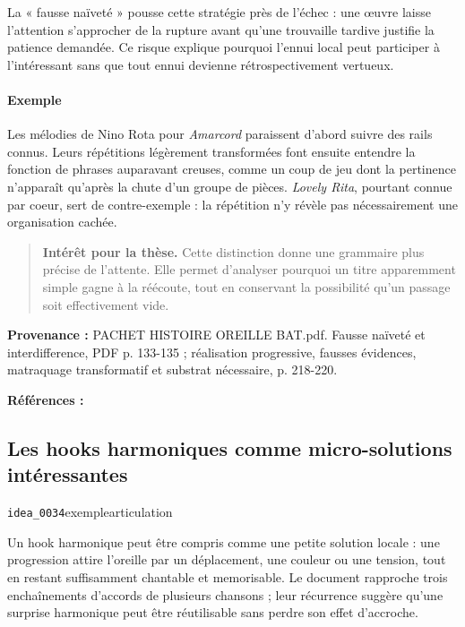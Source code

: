 \documentclass[10pt,a4paper]{article}
\begin{document}
La « fausse naïveté » pousse cette stratégie près de l'échec : une œuvre laisse l'attention s'approcher de la rupture avant qu'une trouvaille tardive justifie la patience demandée. Ce risque explique pourquoi l'ennui local peut participer à l'intéressant sans que tout ennui devienne rétrospectivement vertueux.

\paragraph{Exemple}
Les mélodies de Nino Rota pour \emph{Amarcord} paraissent d'abord suivre des rails connus. Leurs répétitions légèrement transformées font ensuite entendre la fonction de phrases auparavant creuses, comme un coup de jeu dont la pertinence n'apparaît qu'après la chute d'un groupe de pièces. \emph{Lovely Rita}, pourtant connue par coeur, sert de contre-exemple : la répétition n'y révèle pas nécessairement une organisation cachée.

\begin{quote}
\textbf{Intérêt pour la thèse.} Cette distinction donne une grammaire plus précise de l'attente. Elle permet d'analyser pourquoi un titre apparemment simple gagne à la réécoute, tout en conservant la possibilité qu'un passage soit effectivement vide.
\end{quote}
{\footnotesize\color{metadata}\textbf{Provenance :} PACHET HISTOIRE OREILLE BAT.pdf. Fausse naïveté et interdifference, PDF p. 133-135 ; réalisation progressive, fausses évidences, matraquage transformatif et substrat nécessaire, p. 218-220.\par}
{\footnotesize\color{metadata}\textbf{Références :} \parencite{pachet2018oreille}\par}

\subsection{Les hooks harmoniques comme micro-solutions intéressantes}
{\small\color{metadata} \texttt{idea\_0034}\quad\textbullet\quad exemple\quad\textbullet\quad articulation\par}

Un hook harmonique peut être compris comme une petite solution locale : une progression attire l'oreille par un déplacement, une couleur ou une tension, tout en restant suffisamment chantable et memorisable. Le document rapproche trois enchaînements d'accords de plusieurs chansons ; leur récurrence suggère qu'une surprise harmonique peut être réutilisable sans perdre son effet d'accroche.
\end{document}
